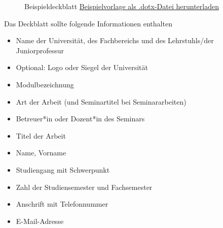 \documentclass[
  letterpaper,
  DIV=11]{scrreprt}
\begin{document}
\begin{figure}


\caption{\label{fig-vorlage_deckblatt}Beispieldeckblatt \textbar{}
{\href{templates/title_page_template.dotx}{Beispielvorlage als
.dotx-Datei herunterladen}}}

\end{figure}%

Das Deckblatt sollte folgende Informationen enthalten

\begin{itemize}
\item
  Name der Universität, des Fachbereichs und des Lehrstuhls/der
  Juniorprofessur
\item
  Optional: Logo oder Siegel der Universität
\item
  Modulbezeichnung
\item
  Art der Arbeit (und Seminartitel bei Seminararbeiten)
\item
  Betreuer*in oder Dozent*in des Seminars
\item
  Titel der Arbeit
\item
  Name, Vorname
\item
  Studiengang mit Schwerpunkt
\item
  Zahl der Studiensemester und Fachsemester
\item
  Anschrift mit Telefonnummer
\item
  E-Mail-Adresse
\end{itemize}
\end{document}
